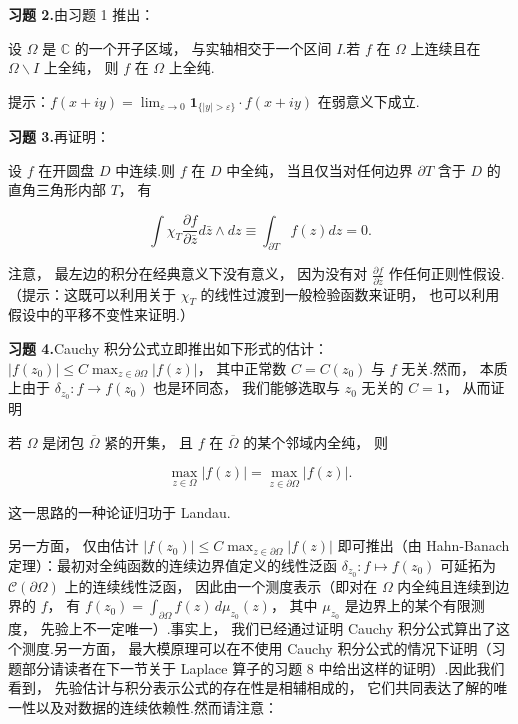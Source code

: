\noindent\textbf{习题 2.}\quad 由习题 1 推出：

\begin{theorem}\label{thm:c4-1.4}
设 $\Omega$ 是 $\mathbb{C}$ 的一个开子区域， 与实轴相交于一个区间 $I$.若 $f$ 在 $\Omega$ 上连续且在 $\Omega\backslash I$ 上全纯， 则 $f$ 在 $\Omega$ 上全纯.
\end{theorem}

提示：$f(x+iy) = \lim_{\varepsilon\to 0}\mathbf{1}_{\{|y|>\varepsilon\}} \cdot f(x+iy)$ 在弱意义下成立.

\noindent\textbf{习题 3.}\quad 再证明：

\begin{theorem}[Morera 定理]\label{thm:c4-1.5}
设 $f$ 在开圆盘 $D$ 中连续.则 $f$ 在 $D$ 中全纯， 当且仅当对任何边界 $\partial T$ 含于 $D$ 的直角三角形内部 $T$， 有

\[
\int \chi_{T}\frac{\partial f}{\partial \bar{z}}d\bar{z} \wedge dz \equiv \int_{\partial T}f(z)dz = 0.
\]
\end{theorem}

注意， 最左边的积分在经典意义下没有意义， 因为没有对 $\frac{\partial f}{\partial \bar{z}}$ 作任何正则性假设.（提示：这既可以利用关于 $\chi_{T}$ 的线性过渡到一般检验函数来证明， 也可以利用假设中的平移不变性来证明.）

\noindent\textbf{习题 4.}\quad Cauchy 积分公式立即推出如下形式的估计：$|f(z_{0})| \leq C\max_{z\in\partial\Omega}|f(z)|$， 其中正常数 $C = C(z_{0})$ 与 $f$ 无关.然而， 本质上由于 $\delta_{z_{0}} : f \to f(z_{0})$ 也是环同态， 我们能够选取与 $z_{0}$ 无关的 $C = 1$， 从而证明

\begin{theorem}[最大模原理]\label{thm:c4-1.6}
若 $\Omega$ 是闭包 $\overline{\Omega}$ 紧的开集， 且 $f$ 在 $\overline{\Omega}$ 的某个邻域内全纯， 则

\[
\max_{z\in\Omega}|f(z)| = \max_{z\in\partial\Omega}|f(z)|.
\]
\end{theorem}

这一思路的一种论证归功于 Landau.

另一方面， 仅由估计 $|f(z_{0})| \leq C\max_{z\in\partial\Omega}|f(z)|$ 即可推出（由 Hahn-Banach 定理）：最初对全纯函数的连续边界值定义的线性泛函 $\delta_{z_{0}} : f \mapsto f(z_{0})$ 可延拓为 $\mathcal{C}(\partial\Omega)$ 上的连续线性泛函， 因此由一个测度表示（即对在 $\Omega$ 内全纯且连续到边界的 $f$， 有 $f(z_{0}) = \int_{\partial\Omega}f(z)\, d\mu_{z_{0}}(z)$， 其中 $\mu_{z_{0}}$ 是边界上的某个有限测度， 先验上不一定唯一）.事实上， 我们已经通过证明 Cauchy 积分公式算出了这个测度.另一方面， 最大模原理可以在不使用 Cauchy 积分公式的情况下证明（习题部分请读者在下一节关于 Laplace 算子的习题 8 中给出这样的证明）.因此我们看到， 先验估计与积分表示公式的存在性是相辅相成的， 它们共同表达了解的唯一性以及对数据的连续依赖性.然而请注意：


